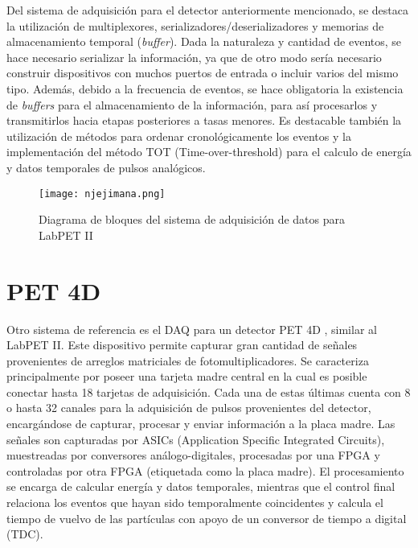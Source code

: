	Del sistema de adquisición para el detector anteriormente mencionado, se destaca la utilización de multiplexores, serializadores/deserializadores y memorias de almacenamiento temporal (\textit{buffer}). Dada la naturaleza y cantidad de eventos, se hace necesario serializar la información, ya que de otro modo sería necesario construir dispositivos con muchos puertos de entrada o incluir varios del mismo tipo. Además, debido a la frecuencia de eventos, se hace obligatoria la existencia de \textit{buffers} para el almacenamiento de la información, para así procesarlos y transmitirlos hacia etapas posteriores a tasas menores. Es destacable también la utilización de métodos para ordenar cronológicamente los eventos y la implementación del método TOT (Time-over-threshold) para el calculo de energía y datos temporales de pulsos analógicos. 
	
	\begin{figure}[h]
		\centering
		\texttt{[image: njejimana.png]}
		\caption{Diagrama de bloques del sistema de adquisición de datos para LabPET II \cite{Njejimana2013DesignImaging}}
		\label{fig:njejimana}
	\end{figure}
	
\newpage
\section{PET 4D}
	
	\par Otro sistema de referencia es el DAQ para un detector PET 4D \cite{Marcatili2011DevelopmentDetector}, similar al LabPET II. Este dispositivo permite capturar gran cantidad de señales provenientes de arreglos matriciales de fotomultiplicadores. Se caracteriza principalmente por poseer una tarjeta madre central en la cual es posible conectar hasta 18 tarjetas de adquisición. Cada una de estas últimas cuenta con 8 o hasta 32 canales para la adquisición de pulsos provenientes del detector, encargándose de capturar, procesar y enviar información a la placa madre.
	Las señales son capturadas por ASICs (Application Specific Integrated Circuits), muestreadas por conversores análogo-digitales, procesadas por una FPGA y controladas por otra FPGA (etiquetada como la placa madre). El procesamiento se encarga de calcular energía y datos temporales, mientras que el control final relaciona los eventos que hayan sido temporalmente coincidentes y calcula el tiempo de vuelvo de las partículas con apoyo de un conversor de tiempo a digital (TDC).
	
